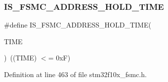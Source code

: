 \subsubsection{\texorpdfstring{I\+S\+\_\+\+F\+S\+M\+C\+\_\+\+A\+D\+D\+R\+E\+S\+S\+\_\+\+H\+O\+L\+D\+\_\+\+T\+I\+ME}{IS\_FSMC\_ADDRESS\_HOLD\_TIME}}
{\footnotesize\ttfamily \#define I\+S\+\_\+\+F\+S\+M\+C\+\_\+\+A\+D\+D\+R\+E\+S\+S\+\_\+\+H\+O\+L\+D\+\_\+\+T\+I\+ME(\begin{DoxyParamCaption}\item[{}]{T\+I\+ME }\end{DoxyParamCaption})~((T\+I\+ME) $<$= 0x\+F)}



Definition at line 463 of file stm32f10x\+\_\+fsmc.\+h.

